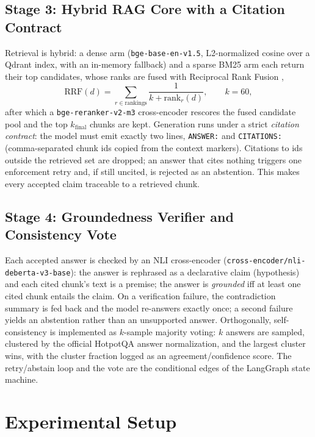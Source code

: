 \documentclass[twocolumn,10pt]{article}
\begin{document}
\subsection{Stage 3: Hybrid RAG Core with a Citation Contract}
\label{sec:rag}
Retrieval is hybrid: a dense arm (\texttt{bge-base-en-v1.5}, L2-normalized
cosine over a Qdrant index, with an in-memory fallback) and a sparse BM25 arm
each return their top candidates, whose ranks are fused with Reciprocal Rank
Fusion \citep{cormack2009rrf},
\begin{equation}
\mathrm{RRF}(d) = \sum_{r \in \text{rankings}} \frac{1}{k + \mathrm{rank}_r(d)},
\qquad k = 60,
\end{equation}
after which a \texttt{bge-reranker-v2-m3} cross-encoder rescores the fused
candidate pool and the top $k_{\text{final}}$ chunks are kept. Generation runs
under a strict \emph{citation contract}: the model must emit exactly two lines,
\texttt{ANSWER:} and \texttt{CITATIONS:} (comma-separated chunk ids copied from
the context markers). Citations to ids outside the retrieved set are dropped;
an answer that cites nothing triggers one enforcement retry and, if still
uncited, is rejected as an abstention. This makes every accepted claim
traceable to a retrieved chunk.

\subsection{Stage 4: Groundedness Verifier and Consistency Vote}
\label{sec:verify}
Each accepted answer is checked by an NLI cross-encoder
(\texttt{cross-encoder/nli-deberta-v3-base}): the answer is rephrased as a
declarative claim (hypothesis) and each cited chunk's text is a premise; the
answer is \emph{grounded} iff at least one cited chunk entails the claim. On a
verification failure, the contradiction summary is fed back and the model
re-answers exactly once; a second failure yields an abstention rather than an
unsupported answer. Orthogonally, self-consistency \citep{wang2023selfconsistency}
is implemented as $k$-sample majority voting: $k$ answers are sampled,
clustered by the official HotpotQA answer normalization, and the largest
cluster wins, with the cluster fraction logged as an agreement/confidence
score. The retry/abstain loop and the vote are the conditional edges of the
LangGraph state machine.

\section{Experimental Setup}
\label{sec:setup}
\end{document}
